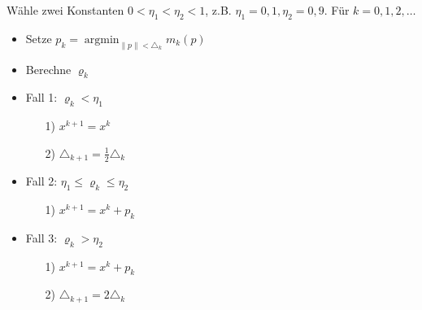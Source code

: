 Wähle zwei Konstanten $0< \eta_1< \eta_2<1$, z.B. $\eta_1=0,1,\eta_2=0,9$. Für $k=0,1,2,\ldots$ \begin{itemize}
	\item Setze $p_k=\operatorname{argmin}_{\lVert p \rVert < \triangle_k} m_k(p)$
	\item Berechne $\varrho_k$
	\item Fall 1: $\varrho_k< \eta_1$ \begin{itemize}
			\item[1)] $x^{k+1}=x^k$
			\item[2)] $\triangle_{k+1}=\frac{1}{2} \triangle_k$
		\end{itemize}
	\item Fall 2: $\eta_1 \leq \varrho_k \leq \eta_2$ \begin{itemize}
            \item[1)] $x^{k+1}=x^k+p_k$
		\end{itemize}
	\item Fall 3: $\varrho_k> \eta_2$ \begin{itemize}
			\item[1)] $x^{k+1}=x^k+p_k$
			\item[2)] $\triangle_{k+1}=2 \triangle_k$
		\end{itemize}
\end{itemize}
